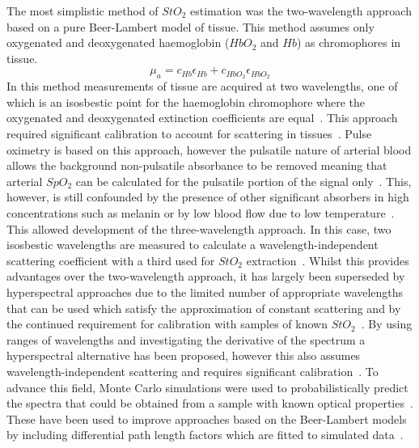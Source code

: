 The most simplistic method of $StO_2$ estimation was the two-wavelength approach based on a pure Beer-Lambert model of tissue. This method assumes only oxygenated and deoxygenated haemoglobin ($HbO_2$ and $Hb$) as chromophores in tissue. 
\begin{equation}
    \mu_a = c_{Hb}\epsilon_{Hb} + c_{HbO_2}\epsilon_{HbO_2}
\end{equation}
In this method measurements of tissue are acquired at two wavelengths, one of which is an isosbestic point for the haemoglobin chromophore where the oxygenated and deoxygenated extinction coefficients are equal~\citep{MacKenzie2018}. This approach required significant calibration to account for scattering in tissues~\citep{MacKenzie2018}. Pulse oximetry is based on this approach, however the pulsatile nature of arterial blood allows the background non-pulsatile absorbance to be removed meaning that arterial $SpO_2$ can be calculated for the pulsatile portion of the signal only~\citep{MacKenzie2018}. This, however, is still confounded by the presence of other significant absorbers in high concentrations such as melanin or by low blood flow due to low temperature~\citep{Bangash2022, MacKenzie2018}. This allowed development of the three-wavelength approach. In this case, two isosbestic wavelengths are measured to calculate a wavelength-independent scattering coefficient with a third used for $StO_2$ extraction~\cite{MacKenzie2018}. Whilst this provides advantages over the two-wavelength approach, it has largely been superseded by hyperspectral approaches due to the limited number of appropriate wavelengths that can be used which satisfy the approximation of constant scattering and by the continued requirement for calibration with samples of known $StO_2$~\cite{MacKenzie2018}. By using ranges of wavelengths and investigating the derivative of the spectrum a hyperspectral alternative has been proposed, however this also assumes wavelength-independent scattering and requires significant calibration~\citep{Holmer2018}. To advance this field, Monte Carlo simulations were used to probabilistically predict the spectra that could be obtained from a sample with known optical properties~\cite{Wang1995}. These have been used to improve approaches based on the Beer-Lambert models by including differential path length factors which are fitted to simulated data~\cite{Clancy2020}. 

